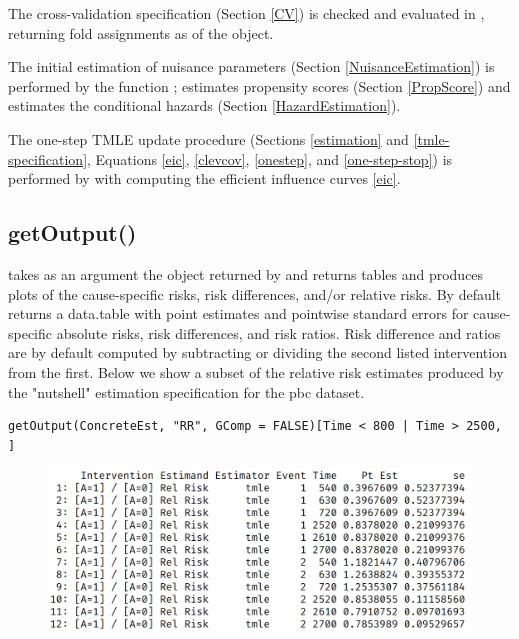 \documentclass{report}
\newcommand{\1}{\ensuremath{\mathbf{1}}}
\begin{document}
The cross-validation specification (Section \ref{CV}) is checked and evaluated in , returning fold assignments as  of the  object.

The initial estimation of nuisance parameters (Section \ref{NuisanceEstimation}) is performed by the function ;  estimates propensity scores (Section \ref{PropScore}) and  estimates the conditional hazards (Section \ref{HazardEstimation}).

The one-step TMLE update procedure (Sections \ref{estimation} and \ref{tmle-specification}, Equations \eqref{eic}, \eqref{clevcov}, \eqref{onestep}, and \eqref{one-step-stop}) is performed by  with  computing the efficient influence curves \eqref{eic}.

\subsection{getOutput()}
\label{getoutput}
 takes as an argument the  object returned by  and returns tables and produces plots of the cause-specific risks, risk differences, and/or relative risks. By default  returns a data.table with point estimates and pointwise standard errors for cause-specific absolute risks, risk differences, and risk ratios. Risk difference and ratios are by default computed by subtracting or dividing the second listed intervention from the first. Below we show a subset of the relative risk estimates produced by the "nutshell" estimation specification for the pbc dataset. 

\begin{lstlisting}
getOutput(ConcreteEst, "RR", GComp = FALSE)[Time < 800 | Time > 2500, ]
\end{lstlisting}

\begin{figure}[H]
\centering
\includegraphics[width=.9\linewidth]{fig/rr-tbl.png}
\end{figure}
\end{document}
